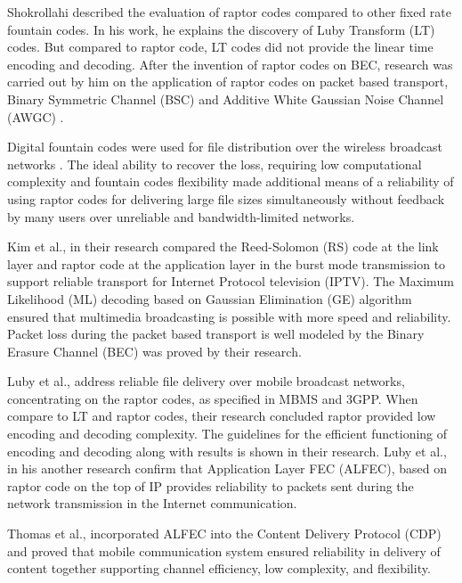 Shokrollahi \cite{shokrollahi2009theory} described the evaluation of raptor codes compared to other fixed rate fountain codes. In his work, he explains the discovery of Luby Transform (LT) codes. But compared to raptor code, LT codes did not provide the linear time encoding and decoding. After the invention of raptor codes on BEC, research was carried out by him on the application of raptor codes on packet based transport, Binary Symmetric Channel (BSC) and Additive White Gaussian Noise Channel (AWGC) \cite{sturley1953radio}.

Digital fountain codes were used for file distribution over the wireless broadcast networks \cite{luby2007reliable}. The ideal ability to recover the loss, requiring low computational complexity and fountain codes flexibility made additional means of a reliability of using raptor codes for delivering large file sizes simultaneously without feedback by many users over unreliable and bandwidth-limited networks. 

Kim et al.,\cite{kim2008performance} in their research compared the Reed-Solomon (RS) code at the link layer and raptor code at the application layer in the burst mode transmission to support reliable transport for Internet Protocol television (IPTV). The Maximum Likelihood (ML) decoding based on Gaussian Elimination (GE) algorithm ensured that multimedia broadcasting is possible with more speed and reliability. Packet loss during the packet based transport is well modeled by the Binary Erasure Channel (BEC) was proved by their research.

Luby et al., \cite{luby2006raptor} address reliable file delivery over mobile broadcast networks, concentrating on the raptor codes, as specified in MBMS and 3GPP. When compare to LT and raptor codes, their research concluded raptor provided low encoding and decoding complexity. The guidelines for the efficient functioning of encoding and decoding along with results is shown in their research. Luby et al., \cite{luby2007high} in his another research confirm that Application Layer FEC (ALFEC), based on raptor code on the top of IP provides reliability to packets sent during the network transmission in the Internet communication. 
 
Thomas et al., \cite{stockhammer2008application} incorporated ALFEC into the Content Delivery Protocol (CDP) and proved that mobile communication system ensured reliability in delivery of content together supporting channel efficiency, low complexity, and flexibility.

